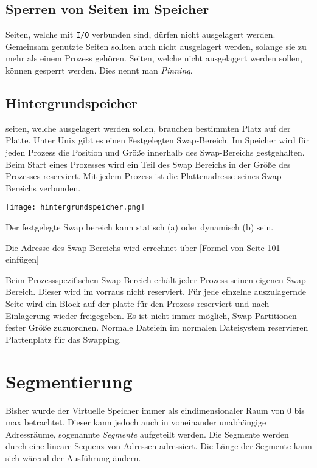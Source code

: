 \subsection{Sperren von Seiten im Speicher}

Seiten, welche mit \texttt{I/O} verbunden sind, dürfen nicht ausgelagert werden. Gemeinsam genutzte Seiten sollten auch nicht ausgelagert werden, solange sie zu mehr als einem Prozess gehören. Seiten, welche nicht ausgelagert werden sollen, können gesperrt werden. Dies nennt man \textit{Pinning}.

\subsection{Hintergrundspeicher}

seiten, welche ausgelagert werden sollen, brauchen bestimmten Platz auf der Platte. Unter Unix gibt es einen Festgelegten Swap-Bereich. Im Speicher wird für jeden Prozess die Position und Größe innerhalb des Swap-Bereichs gestgehalten. Beim Start eines Prozesses wird ein Teil des Swap Bereichs in der Größe des Prozesses reserviert. Mit jedem Prozess ist die Plattenadresse seines Swap-Bereichs verbunden. 

\texttt{[image: hintergrundspeicher.png]}

Der festgelegte Swap bereich kann statisch (a) oder dynamisch (b) sein. 

Die Adresse des Swap Bereichs wird errechnet über [Formel von Seite 101 einfügen]

Beim Prozessspezifischen Swap-Bereich erhält jeder Prozess seinen eigenen Swap-Bereich. Dieser wird im vorraus nicht reserviert. Für jede einzelne auszulagernde Seite wird ein Block auf der platte für den Prozess reserviert und nach Einlagerung wieder freigegeben. Es ist nicht immer möglich, Swap Partitionen fester Größe zuzuordnen. Normale Dateiein im normalen Datei\-system reservieren Plattenplatz für das Swapping. 

\section{Segmentierung}

Bisher wurde der Virtuelle Speicher immer als eindimensionaler Raum von 0 bis max betrachtet. Dieser kann jedoch auch in voneinander unabhängige Adressräume, sogenannte \textit{Segmente} aufgeteilt werden. Die Segmente werden durch eine lineare Sequenz von Adressen adressiert. Die Länge der Segmente kann sich wärend der Ausführung ändern. 

